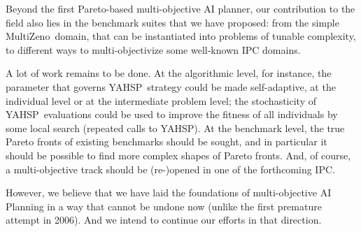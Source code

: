 \documentclass[english]{DESCARWINreport}
\newcounter{con}
\def\YAHSP{{\sc YAHSP}}
\def\MULTIZENO{{\sc MultiZeno}}
\begin{document}
Beyond the first Pareto-based multi-objective AI planner, our contribution to the field also lies in the benchmark suites that we have proposed: from the simple \MULTIZENO\ domain, that can be instantiated into problems of tunable complexity, to different ways to multi-objectivize some well-known IPC domains. 

A lot of work remains to be done. At the algorithmic level, for instance, the parameter that governs \YAHSP\ strategy could be made self-adaptive, at the individual level or at the intermediate problem level; the stochasticity of \YAHSP\ evaluations could be used to improve the fitness of all individuals by some local search (repeated calls to \YAHSP). At the benchmark level, the true Pareto fronts of existing benchmarks should be sought, and in particular it should be possible to find more complex shapes of Pareto fronts. And, of course, a multi-objective track should be (re-)opened in one of the forthcoming IPC.

However, we believe that we have laid the foundations of multi-objective AI Planning in a way that cannot be undone now (unlike the first premature attempt in 2006). And we intend to continue our efforts in that direction.
\end{document}
